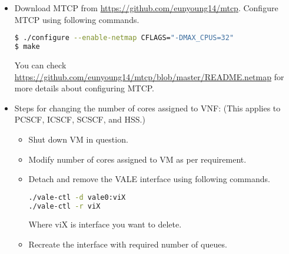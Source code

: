 \documentclass[hidelinks]{report}
\begin{document}
\begin{itemize}
\item Download MTCP from \url{https://github.com/eunyoung14/mtcp}.
Configure MTCP using following commands.
\begin{lstlisting}[language=bash]
$ ./configure --enable-netmap CFLAGS="-DMAX_CPUS=32" 
$ make
\end{lstlisting}

You can check \url{https://github.com/eunyoung14/mtcp/blob/master/README.netmap} for more details about configuring MTCP. 

\item Steps for changing the number of cores assigned to VNF: (This applies to PCSCF, ICSCF, SCSCF, and HSS.)
\begin{itemize}
\item Shut down VM in question.
\item Modify number of cores assigned to VM as per requirement.
\item Detach and remove the VALE interface using following commands.
\begin{lstlisting}[language=bash]
./vale-ctl -d vale0:viX
./vale-ctl -r viX
\end{lstlisting}
Where viX is interface you want to delete.
\item Recreate the interface with required number of queues.

\end{itemize}
\end{itemize}
\end{document}
